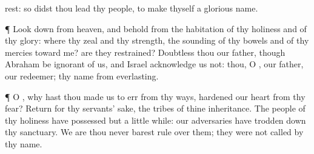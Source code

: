{rest: so didst thou
lead thy
people, to
make thyself a
glorious
name.
\par }{\PP {}¶ Look
down from
heaven, and
behold from the
habitation of thy
holiness and of thy
glory: where
{} thy
zeal and thy
strength, the
sounding of thy
bowels and of thy
mercies toward me? are they
restrained?
Doubtless thou
{} our
father, though
Abraham be
ignorant of us, and
Israel
acknowledge us not: thou, O
{},
{} our
father, our
redeemer; thy
name
{} from
everlasting.
\par }{\PP {}¶ O
{}, why hast thou made us to
err from thy
ways,
{}
hardened our
heart from thy
fear?
Return for thy
servants’ sake, the
tribes of thine
inheritance.
The
people of thy
holiness have
possessed
{} but a little
while: our
adversaries have trodden
down thy
sanctuary.
We are
{} thou
never barest
rule over them; they were not
called by thy
name.

}
